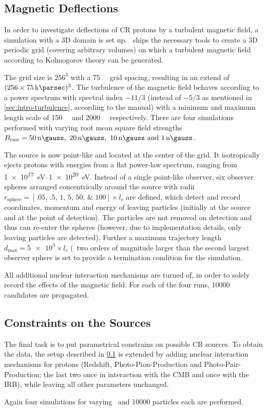 \subsection{Magnetic Deflections}
\label{sec:setup-defl}
In order to investigate deflections of CR protons by a turbulent
magnetic field, a simulation with a 3D domain is set up. \CRPropa~ships the
necessary tools to create a 3D periodic grid (covering arbitrary volumes) on
which a turbulent magnetic field according to Kolmogorov theory can be
generated.

The grid size is $256^3$ with a \SI{75}{\kilo\parsec} grid spacing, resulting
in an extend of $(256\times\SI{75}{\kilo\parsec})^3$. The turbulence of the
magnetic field behaves according to a power spectrum with spectral index
$-11/3$ (instead of $-5/3$ as mentioned in \cref{sec:intro-turbulence},
according to the manual) with a minimum and maximum length scale of
\SI{150}{\kilo\parsec} and \SI{2000}{\kilo\parsec} respectively.
There are four simulations performed with varying root mean square field
strengths $\Brms=\SIlist{50;20;10;1}{\nano\gauss}$.

The source is now point-like and located at the center of the grid. It
isotropically ejects protons with energies from a flat power-law spectrum,
ranging from \SIrange{1e17}{1e20}{\electronvolt}. Instead of a single
point-like observer, six observer spheres arranged concentrically around the
source with radii
$r_{\mathrm{sphere}}=[\numlist[list-final-separator={,}]{.05;.5;1;5;50;100}]\times
l_c$ are defined, which detect and record coordinates, momentum and
energy of leaving particles (initially at the source and at the point of
detection). The particles are not removed on detection and
thus can re-enter the spheres (however, due to implementation details, only
leaving particles are detected). Further a maximum trajectory length
$d_{\mathrm{max}}=\num{5e3}\times l_c$ (\ie~two orders of magnitude larger than
the second largest observer sphere is set to provide a termination condition
for the simulation.

All additional nuclear interaction mechanisms are turned of, in order to solely
record the effects of the magnetic field.
For each of the four runs, \num{10000} candidates are propagated.


\subsection{Constraints on the Sources}
The final task is to put parametrical constrains on possible CR sources. To
obtain the data, the setup described in \cref{sec:setup-defl} is extended by
adding nuclear interaction mechanisms for protons (Redshift,
Photo-Pion-Production and Photo-Pair-Production; the last two once in
interaction with the CMB and once with the IRB), while leaving all other
parameters unchanged.

Again four simulations for varying \Brms~and \num{10000} particles each are
performed.


